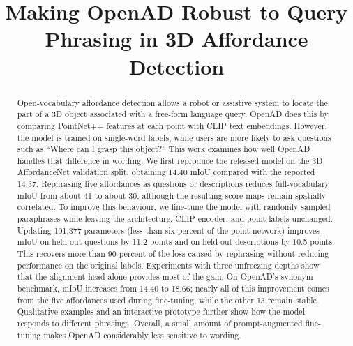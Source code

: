 \documentclass[conference]{IEEEtran}
\begin{document}
\title{Making OpenAD Robust to Query Phrasing in 3D Affordance Detection}

\author{
\and
{}
\and
{}
}

\maketitle

\begin{abstract}
Open-vocabulary affordance detection allows a robot or assistive system to locate the part of a 3D object associated with a free-form language query. OpenAD does this by comparing PointNet++ features at each point with CLIP text embeddings. However, the model is trained on single-word labels, while users are more likely to ask questions such as ``Where can I grasp this object?'' This work examines how well OpenAD handles that difference in wording. We first reproduce the released model on the 3D AffordanceNet validation split, obtaining 14.40 mIoU compared with the reported 14.37. Rephrasing five affordances as questions or descriptions reduces full-vocabulary mIoU from about 41 to about 30, although the resulting score maps remain spatially correlated. To improve this behaviour, we fine-tune the model with randomly sampled paraphrases while leaving the architecture, CLIP encoder, and point labels unchanged. Updating 101,377 parameters (less than six percent of the point network) improves mIoU on held-out questions by 11.2 points and on held-out descriptions by 10.5 points. This recovers more than 90 percent of the loss caused by rephrasing without reducing performance on the original labels. Experiments with three unfreezing depths show that the alignment head alone provides most of the gain. On OpenAD's synonym benchmark, mIoU increases from 14.40 to 18.66; nearly all of this improvement comes from the five affordances used during fine-tuning, while the other 13 remain stable. Qualitative examples and an interactive prototype further show how the model responds to different phrasings. Overall, a small amount of prompt-augmented fine-tuning makes OpenAD considerably less sensitive to wording.
\end{abstract}
\end{document}
